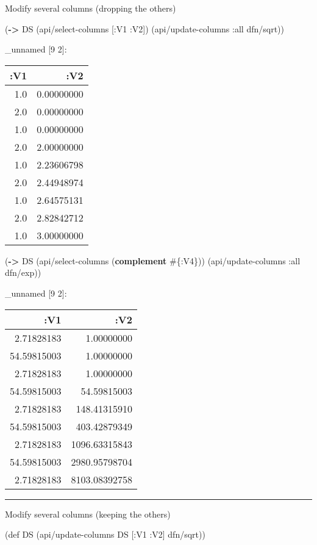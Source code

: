 \documentclass[]{article}
\newenvironment{Shaded}{\begin{snugshade}}{\end{snugshade}}
\newcommand{\KeywordTok}[1]{\textcolor[rgb]{0.13,0.29,0.53}{\textbf{#1}}}
\newcommand{\FunctionTok}[1]{\textcolor[rgb]{0.00,0.00,0.00}{#1}}
\newcommand{\BuiltInTok}[1]{#1}
\newcommand{\AttributeTok}[1]{\textcolor[rgb]{0.77,0.63,0.00}{#1}}
\newcommand{\NormalTok}[1]{#1}
\begin{document}
Modify several columns (dropping the others)

\begin{Shaded}
\begin{Highlighting}[]
\NormalTok{(}\KeywordTok{->}\NormalTok{ DS}
\NormalTok{    (api/select-columns [}\AttributeTok{:V1} \AttributeTok{:V2}\NormalTok{])}
\NormalTok{    (api/update-columns }\AttributeTok{:all}\NormalTok{ dfn/sqrt))}
\end{Highlighting}
\end{Shaded}

\_unnamed {[}9 2{]}:

\begin{longtable}[]{@{}rr@{}}
\toprule
:V1 & :V2\tabularnewline
\midrule
\endhead
1.0 & 0.00000000\tabularnewline
2.0 & 0.00000000\tabularnewline
1.0 & 0.00000000\tabularnewline
2.0 & 2.00000000\tabularnewline
1.0 & 2.23606798\tabularnewline
2.0 & 2.44948974\tabularnewline
1.0 & 2.64575131\tabularnewline
2.0 & 2.82842712\tabularnewline
1.0 & 3.00000000\tabularnewline
\bottomrule
\end{longtable}

\begin{Shaded}
\begin{Highlighting}[]
\NormalTok{(}\KeywordTok{->}\NormalTok{ DS}
\NormalTok{    (api/select-columns (}\KeywordTok{complement}\NormalTok{ #\{}\AttributeTok{:V4}\NormalTok{\}))}
\NormalTok{    (api/update-columns }\AttributeTok{:all}\NormalTok{ dfn/exp))}
\end{Highlighting}
\end{Shaded}

\_unnamed {[}9 2{]}:

\begin{longtable}[]{@{}rr@{}}
\toprule
:V1 & :V2\tabularnewline
\midrule
\endhead
2.71828183 & 1.00000000\tabularnewline
54.59815003 & 1.00000000\tabularnewline
2.71828183 & 1.00000000\tabularnewline
54.59815003 & 54.59815003\tabularnewline
2.71828183 & 148.41315910\tabularnewline
54.59815003 & 403.42879349\tabularnewline
2.71828183 & 1096.63315843\tabularnewline
54.59815003 & 2980.95798704\tabularnewline
2.71828183 & 8103.08392758\tabularnewline
\bottomrule
\end{longtable}

\begin{center}\rule{0.5\linewidth}{0.5pt}\end{center}

Modify several columns (keeping the others)

\begin{Shaded}
\begin{Highlighting}[]
\NormalTok{(}\BuiltInTok{def}\FunctionTok{ DS }\NormalTok{(api/update-columns DS [}\AttributeTok{:V1} \AttributeTok{:V2}\NormalTok{] dfn/sqrt))}
\end{Highlighting}
\end{Shaded}
\end{document}
